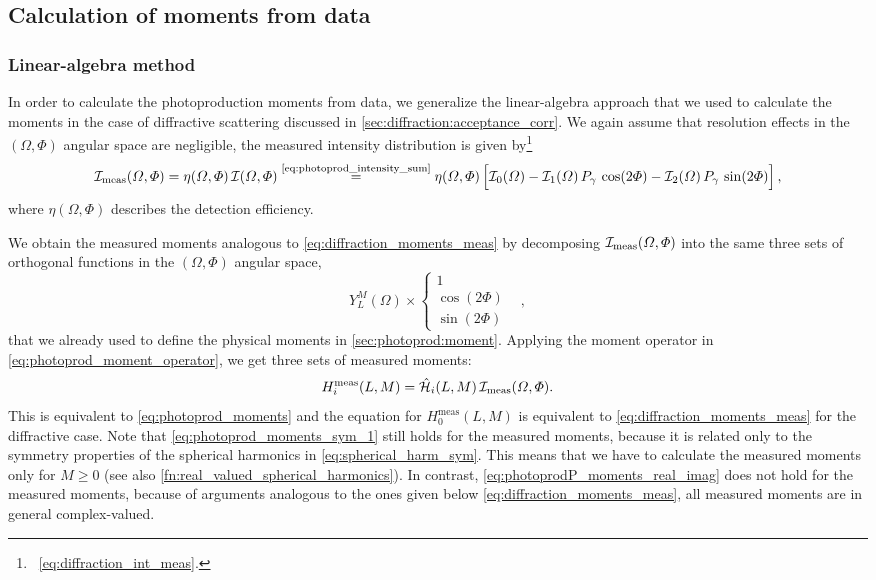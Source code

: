 \subsection{Calculation of moments from data}%
\label{sec:photoprod:moments_data}

\subsubsection{Linear-algebra method}%
\label{sec:photoprod:linalg_method}

In order to calculate the photoproduction moments from data, we
generalize the linear-algebra approach that we used to calculate the
moments in the case of diffractive scattering discussed in
\cref{sec:diffraction:acceptance_corr}.  We again assume that
resolution effects in the $(\Omega, \Phi)$ angular space are
negligible, \ie the measured intensity distribution is given
by\footnote{\Confer\ \cref{eq:diffraction_int_meas}.}
\begin{equation}
  \label{eq:photoprod_intensity_meas}
  \intensity_\text{meas}(\Omega, \Phi)
  = \eta(\Omega, \Phi)\, \intensity(\Omega, \Phi)
  \equalUsing{\cref{eq:photoprod_intensity_sum}} \eta(\Omega, \Phi) \sBrk[2]{\intensity_0(\Omega)
  - \intensity_1(\Omega)\, P_\gamma\, \cos(2 \Phi)
  - \intensity_2(\Omega)\, P_\gamma\, \sin(2 \Phi)},
\end{equation}
where $\eta(\Omega, \Phi)$ describes the detection efficiency.

We obtain the measured moments analogous to
\cref{eq:diffraction_moments_meas} by decomposing
$\mathcal{I}_\text{meas}(\Omega, \Phi)$ into the same three sets of
orthogonal functions in the $(\Omega, \Phi)$ angular space, \ie
\begin{equation}
  Y_L^M(\Omega) \times \begin{cases}
    1 & \\
    \cos(2 \Phi) & \\
    \sin(2 \Phi) &
  \end{cases},
\end{equation}
that we already used to define the physical moments in
\cref{sec:photoprod:moment}.  Applying the moment operator in
\cref{eq:photoprod_moment_operator}, we get three sets of measured
moments:
\begin{equation}
  \label{eq:photoprod_moments_meas}
  H_i^\text{meas}(L, M)
  = \hat{\mathcal{H}}_i(L, M)\, \mathcal{I}_\text{meas}(\Omega, \Phi).
\end{equation}
This is equivalent to
\cref{eq:photoprod_moments}
and the equation for $H_0^\text{meas}(L, M)$ is equivalent to
\cref{eq:diffraction_moments_meas} for the diffractive case.  Note
that \cref{eq:photoprod_moments_sym_1} still holds for the measured
moments, because it is related only to the symmetry properties of the
spherical harmonics in \cref{eq:spherical_harm_sym}.  This means that
we have to calculate the measured moments only for $M \geq 0$ (see
also \cref{fn:real_valued_spherical_harmonics}).  In contrast,
\cref{eq:photoprodP_moments_real_imag} does not hold for the measured
moments, because of arguments analogous to the ones given below
\cref{eq:diffraction_moments_meas}, \ie all measured moments are in
general complex-valued.


